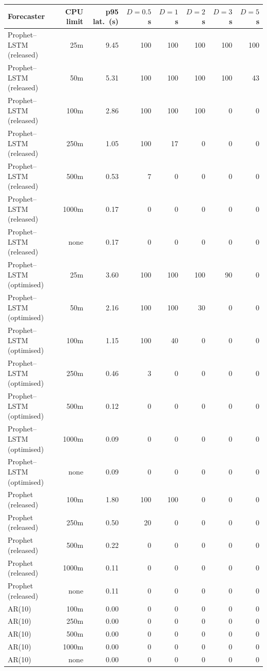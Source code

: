 \begin{tabular}{@{}lrrrrrrr@{}}\toprule
Forecaster & CPU limit & p95 lat.\ (s) & $D{=}0.5$\,s & $D{=}1$\,s & $D{=}2$\,s & $D{=}3$\,s & $D{=}5$\,s \\ \midrule
Prophet--LSTM (released) & 25m & 9.45 & 100 & 100 & 100 & 100 & 100 \\
Prophet--LSTM (released) & 50m & 5.31 & 100 & 100 & 100 & 100 & 43 \\
Prophet--LSTM (released) & 100m & 2.86 & 100 & 100 & 100 & 0 & 0 \\
Prophet--LSTM (released) & 250m & 1.05 & 100 & 17 & 0 & 0 & 0 \\
Prophet--LSTM (released) & 500m & 0.53 & 7 & 0 & 0 & 0 & 0 \\
Prophet--LSTM (released) & 1000m & 0.17 & 0 & 0 & 0 & 0 & 0 \\
Prophet--LSTM (released) & none & 0.17 & 0 & 0 & 0 & 0 & 0 \\
\midrule
Prophet--LSTM (optimised) & 25m & 3.60 & 100 & 100 & 100 & 90 & 0 \\
Prophet--LSTM (optimised) & 50m & 2.16 & 100 & 100 & 30 & 0 & 0 \\
Prophet--LSTM (optimised) & 100m & 1.15 & 100 & 40 & 0 & 0 & 0 \\
Prophet--LSTM (optimised) & 250m & 0.46 & 3 & 0 & 0 & 0 & 0 \\
Prophet--LSTM (optimised) & 500m & 0.12 & 0 & 0 & 0 & 0 & 0 \\
Prophet--LSTM (optimised) & 1000m & 0.09 & 0 & 0 & 0 & 0 & 0 \\
Prophet--LSTM (optimised) & none & 0.09 & 0 & 0 & 0 & 0 & 0 \\
\midrule
Prophet (released) & 100m & 1.80 & 100 & 100 & 0 & 0 & 0 \\
Prophet (released) & 250m & 0.50 & 20 & 0 & 0 & 0 & 0 \\
Prophet (released) & 500m & 0.22 & 0 & 0 & 0 & 0 & 0 \\
Prophet (released) & 1000m & 0.11 & 0 & 0 & 0 & 0 & 0 \\
Prophet (released) & none & 0.11 & 0 & 0 & 0 & 0 & 0 \\
\midrule
AR(10) & 100m & 0.00 & 0 & 0 & 0 & 0 & 0 \\
AR(10) & 250m & 0.00 & 0 & 0 & 0 & 0 & 0 \\
AR(10) & 500m & 0.00 & 0 & 0 & 0 & 0 & 0 \\
AR(10) & 1000m & 0.00 & 0 & 0 & 0 & 0 & 0 \\
AR(10) & none & 0.00 & 0 & 0 & 0 & 0 & 0 \\
\bottomrule\end{tabular}
